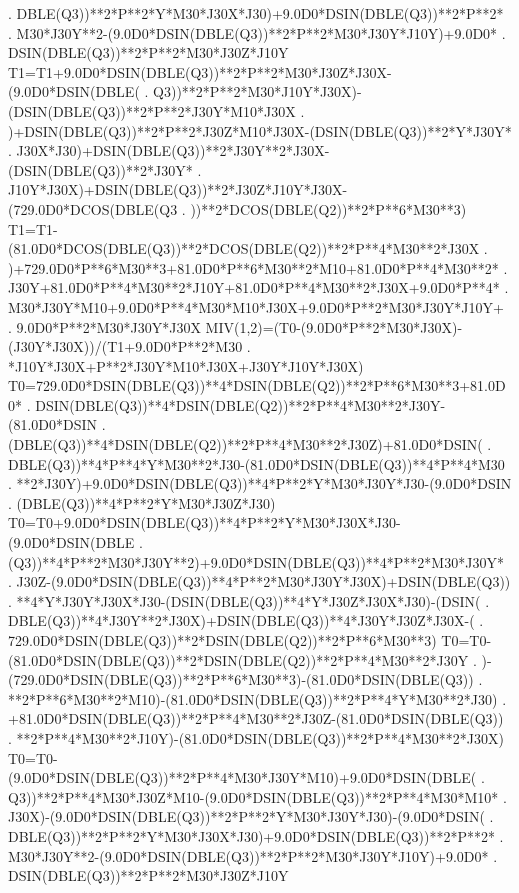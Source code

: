 \begin{framedverbatim}
     . DBLE(Q3))**2*P**2*Y*M30*J30X*J30)+9.0D0*DSIN(DBLE(Q3))**2*P**2*
     . M30*J30Y**2-(9.0D0*DSIN(DBLE(Q3))**2*P**2*M30*J30Y*J10Y)+9.0D0*
     . DSIN(DBLE(Q3))**2*P**2*M30*J30Z*J10Y
      T1=T1+9.0D0*DSIN(DBLE(Q3))**2*P**2*M30*J30Z*J30X-(9.0D0*DSIN(DBLE(
     . Q3))**2*P**2*M30*J10Y*J30X)-(DSIN(DBLE(Q3))**2*P**2*J30Y*M10*J30X
     . )+DSIN(DBLE(Q3))**2*P**2*J30Z*M10*J30X-(DSIN(DBLE(Q3))**2*Y*J30Y*
     . J30X*J30)+DSIN(DBLE(Q3))**2*J30Y**2*J30X-(DSIN(DBLE(Q3))**2*J30Y*
     . J10Y*J30X)+DSIN(DBLE(Q3))**2*J30Z*J10Y*J30X-(729.0D0*DCOS(DBLE(Q3
     . ))**2*DCOS(DBLE(Q2))**2*P**6*M30**3)
      T1=T1-(81.0D0*DCOS(DBLE(Q3))**2*DCOS(DBLE(Q2))**2*P**4*M30**2*J30X
     . )+729.0D0*P**6*M30**3+81.0D0*P**6*M30**2*M10+81.0D0*P**4*M30**2*
     . J30Y+81.0D0*P**4*M30**2*J10Y+81.0D0*P**4*M30**2*J30X+9.0D0*P**4*
     . M30*J30Y*M10+9.0D0*P**4*M30*M10*J30X+9.0D0*P**2*M30*J30Y*J10Y+
     . 9.0D0*P**2*M30*J30Y*J30X
      MIV(1,2)=(T0-(9.0D0*P**2*M30*J30X)-(J30Y*J30X))/(T1+9.0D0*P**2*M30
     . *J10Y*J30X+P**2*J30Y*M10*J30X+J30Y*J10Y*J30X)
      T0=729.0D0*DSIN(DBLE(Q3))**4*DSIN(DBLE(Q2))**2*P**6*M30**3+81.0D0*
     . DSIN(DBLE(Q3))**4*DSIN(DBLE(Q2))**2*P**4*M30**2*J30Y-(81.0D0*DSIN
     . (DBLE(Q3))**4*DSIN(DBLE(Q2))**2*P**4*M30**2*J30Z)+81.0D0*DSIN(
     . DBLE(Q3))**4*P**4*Y*M30**2*J30-(81.0D0*DSIN(DBLE(Q3))**4*P**4*M30
     . **2*J30Y)+9.0D0*DSIN(DBLE(Q3))**4*P**2*Y*M30*J30Y*J30-(9.0D0*DSIN
     . (DBLE(Q3))**4*P**2*Y*M30*J30Z*J30)
      T0=T0+9.0D0*DSIN(DBLE(Q3))**4*P**2*Y*M30*J30X*J30-(9.0D0*DSIN(DBLE
     . (Q3))**4*P**2*M30*J30Y**2)+9.0D0*DSIN(DBLE(Q3))**4*P**2*M30*J30Y*
     . J30Z-(9.0D0*DSIN(DBLE(Q3))**4*P**2*M30*J30Y*J30X)+DSIN(DBLE(Q3))
     . **4*Y*J30Y*J30X*J30-(DSIN(DBLE(Q3))**4*Y*J30Z*J30X*J30)-(DSIN(
     . DBLE(Q3))**4*J30Y**2*J30X)+DSIN(DBLE(Q3))**4*J30Y*J30Z*J30X-(
     . 729.0D0*DSIN(DBLE(Q3))**2*DSIN(DBLE(Q2))**2*P**6*M30**3)
      T0=T0-(81.0D0*DSIN(DBLE(Q3))**2*DSIN(DBLE(Q2))**2*P**4*M30**2*J30Y
     . )-(729.0D0*DSIN(DBLE(Q3))**2*P**6*M30**3)-(81.0D0*DSIN(DBLE(Q3))
     . **2*P**6*M30**2*M10)-(81.0D0*DSIN(DBLE(Q3))**2*P**4*Y*M30**2*J30)
     . +81.0D0*DSIN(DBLE(Q3))**2*P**4*M30**2*J30Z-(81.0D0*DSIN(DBLE(Q3))
     . **2*P**4*M30**2*J10Y)-(81.0D0*DSIN(DBLE(Q3))**2*P**4*M30**2*J30X)
      T0=T0-(9.0D0*DSIN(DBLE(Q3))**2*P**4*M30*J30Y*M10)+9.0D0*DSIN(DBLE(
     . Q3))**2*P**4*M30*J30Z*M10-(9.0D0*DSIN(DBLE(Q3))**2*P**4*M30*M10*
     . J30X)-(9.0D0*DSIN(DBLE(Q3))**2*P**2*Y*M30*J30Y*J30)-(9.0D0*DSIN(
     . DBLE(Q3))**2*P**2*Y*M30*J30X*J30)+9.0D0*DSIN(DBLE(Q3))**2*P**2*
     . M30*J30Y**2-(9.0D0*DSIN(DBLE(Q3))**2*P**2*M30*J30Y*J10Y)+9.0D0*
     . DSIN(DBLE(Q3))**2*P**2*M30*J30Z*J10Y

\end{framedverbatim}
